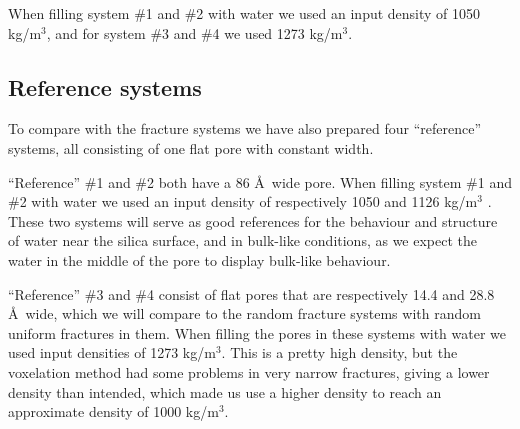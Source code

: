 When filling system \#1 and \#2 with water we used an input density of 1050 kg/m$^3$, and for system \#3 and \#4 we used 1273 kg/m$^3$.


\subsection*{Reference systems}
To compare with the fracture systems we have also prepared four ``reference'' systems, all consisting of one flat pore with constant width. 

``Reference'' \#1 and \#2 both have a 86 \AA\ wide pore. When filling system \#1 and \#2 with water we used an input density of respectively 1050 and 1126 kg/m$^3$%
. These two systems will serve as good references for the behaviour and structure of water near the silica surface, and in bulk-like conditions, as we expect the water in the middle of the pore to display bulk-like behaviour.%
%
%

``Reference'' \#3 and \#4 consist of flat pores that are respectively 14.4 and 28.8 \AA\ wide, which we will compare to the random fracture systems with random uniform fractures in them. When filling the pores in these systems with water we used input densities of 1273 kg/m$^3$. This is a pretty high density, but the voxelation method had some problems in very narrow fractures, giving a lower density than intended, which made us use a higher density to reach an approximate density of 1000 kg/m$^3$.
